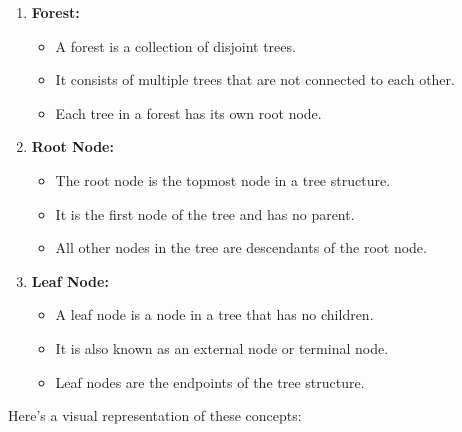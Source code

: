 \begin{enumerate}
\def\labelenumi{\arabic{enumi}.}
\tightlist
\item
  \textbf{Forest:}

  \begin{itemize}
  \tightlist
  \item
    A forest is a collection of disjoint trees.
  \item
    It consists of multiple trees that are not connected to each other.
  \item
    Each tree in a forest has its own root node.
  \end{itemize}
\item
  \textbf{Root Node:}

  \begin{itemize}
  \tightlist
  \item
    The root node is the topmost node in a tree structure.
  \item
    It is the first node of the tree and has no parent.
  \item
    All other nodes in the tree are descendants of the root node.
  \end{itemize}
\item
  \textbf{Leaf Node:}

  \begin{itemize}
  \tightlist
  \item
    A leaf node is a node in a tree that has no children.
  \item
    It is also known as an external node or terminal node.
  \item
    Leaf nodes are the endpoints of the tree structure.
  \end{itemize}
\end{enumerate}

Here's a visual representation of these concepts:

\begin{Shaded}
\begin{Highlighting}[]
    
    
\end{Highlighting}
\end{Shaded}

